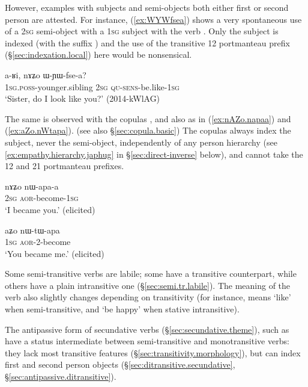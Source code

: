 However, examples with subjects and semi-objects both either first or second person are attested. For instance, (\ref{ex:WYWfsea}) shows a very spontaneous use of a \textsc{2sg} semi-object with a \textsc{1sg} subject with the verb . Only the subject is indexed (with the suffix ) and the use of the transitive  1\fl{}2 portmanteau prefix (§\ref{sec:indexation.local}) here would be nonsensical. 

\begin{exe}
\ex \label{ex:WYWfsea}
\gll a-ʁi, nɤʑo ɯ-ɲɯ-fse-a? \\
\textsc{1sg}.\textsc{poss}-younger.sibling \textsc{2sg} \textsc{qu}-\textsc{sens}-be.like-\textsc{1sg} \\
\glt `Sister, do I look like you?' (2014-kWlAG)
\end{exe}

The same is observed with the copulas ,   and also  as in (\ref{ex:nAZo.napaa}) and (\ref{ex:aZo.nWtapa}). (see also §\ref{sec:copula.basic}) The copulas always index the subject, never the semi-object, independently of any person hierarchy (see \ref{ex:empathy.hierarchy.japhug} in §\ref{sec:direct-inverse} below), and cannot take the  1\fl{}2  and  2\fl{}1 portmanteau prefixes.
 
\begin{exe}
\ex \label{ex:nAZo.napaa}
\gll nɤʑo nɯ-apa-a \\
\textsc{2sg} \textsc{aor}-become-\textsc{1sg} \\
\glt `I became you.' (elicited)
\end{exe}

\begin{exe}
\ex \label{ex:aZo.nWtapa}
\gll aʑo nɯ-tɯ-apa \\
\textsc{1sg} \textsc{aor}-2-become \\
\glt `You became me.' (elicited)
\end{exe}

Some semi-transitive verbs are labile; some have a transitive counterpart, while others have a plain intransitive one (§\ref{sec:semi.tr.labile}). The meaning of the verb also slightly changes depending on transitivity (for instance,  means `like' when semi-transitive, and `be happy' when stative intransitive).
  
The antipassive form of secundative verbs (§\ref{sec:secundative.theme}), such as  have a status intermediate between semi-transitive and monotransitive verbs: they lack most transitive features (§\ref{sec:transitivity.morphology}), but can index first and second person objects (§\ref{sec:ditransitive.secundative}, §\ref{sec:antipassive.ditransitive}).

